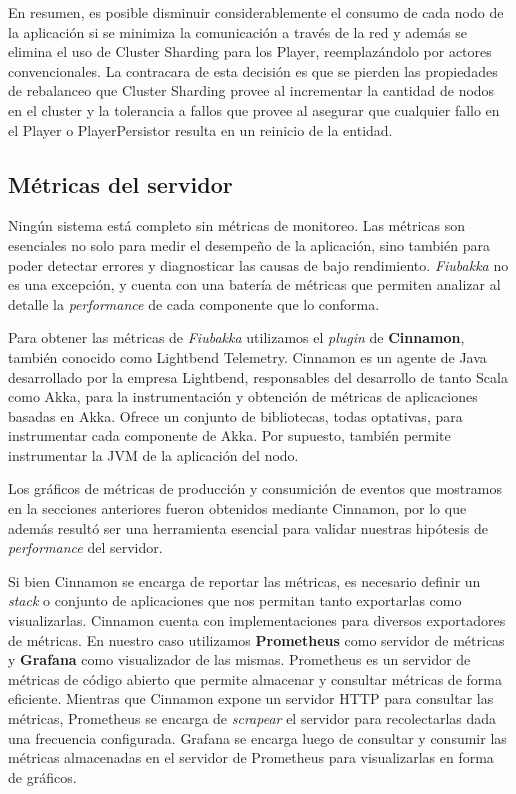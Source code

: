 En resumen, es posible disminuir considerablemente el consumo de cada nodo de la aplicación si se minimiza la comunicación a través de la red y además se elimina el uso de Cluster Sharding
para los Player, reemplazándolo por actores convencionales. La contracara de esta decisión es que se pierden las propiedades de rebalanceo que Cluster Sharding provee al incrementar la cantidad de nodos
en el cluster y la tolerancia a fallos que provee al asegurar que cualquier fallo en el Player o PlayerPersistor resulta en un reinicio de la entidad.

\subsection{Métricas del servidor}

\noindent Ningún sistema está completo sin métricas de monitoreo. Las métricas son esenciales no solo para medir el desempeño de la aplicación, sino también para poder detectar errores y diagnosticar las causas de bajo rendimiento.
\textit{Fiubakka} no es una excepción, y cuenta con una batería de métricas que permiten analizar al detalle la \textit{performance} de cada componente que lo conforma.

Para obtener las métricas de \textit{Fiubakka} utilizamos el \textit{plugin} de \textbf{Cinnamon}, también conocido como Lightbend Telemetry. Cinnamon es un agente de Java desarrollado por la empresa Lightbend, responsables del desarrollo de tanto Scala
como Akka, para la instrumentación y obtención de métricas de aplicaciones basadas en Akka. Ofrece un conjunto de bibliotecas, todas optativas, para instrumentar cada componente de Akka. Por supuesto, también permite instrumentar la JVM de la aplicación
del nodo.

Los gráficos de métricas de producción y consumición de eventos que mostramos en la secciones anteriores fueron obtenidos mediante Cinnamon, por lo que además resultó ser una herramienta esencial para validar nuestras hipótesis de \textit{performance}
del servidor.

Si bien Cinnamon se encarga de reportar las métricas, es necesario definir un \textit{stack} o conjunto de aplicaciones que nos permitan tanto exportarlas como visualizarlas. Cinnamon cuenta con implementaciones para diversos exportadores de métricas.
En nuestro caso utilizamos \textbf{Prometheus} como servidor de métricas y \textbf{Grafana} como visualizador de las mismas. Prometheus es un servidor de métricas de código abierto que permite almacenar y consultar métricas de forma eficiente.
Mientras que Cinnamon expone un servidor HTTP para consultar las métricas, Prometheus se encarga de \textit{scrapear} el servidor para recolectarlas dada una frecuencia configurada. Grafana se encarga luego de consultar y consumir las métricas almacenadas
en el servidor de Prometheus para visualizarlas en forma de gráficos.

